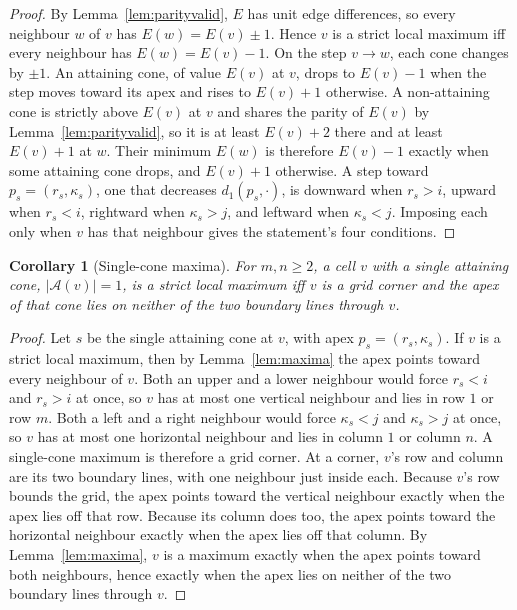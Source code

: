 \documentclass[11pt]{article}
\newtheorem{corollary}[theorem]{Corollary}
\theoremstyle{definition}
\theoremstyle{remark}
\newcommand{\dgrid}{d_1}
\newcommand{\Aset}{\mathcal{A}}
\begin{document}
\begin{proof}
By Lemma~\ref{lem:parityvalid}, $E$ has unit edge differences, so every
neighbour $w$ of $v$ has $E(w)=E(v)\pm1$. Hence $v$ is a strict local maximum iff
every neighbour has $E(w)=E(v)-1$. On the step $v\to w$, each cone changes by
$\pm1$. An attaining cone, of value $E(v)$ at $v$, drops to $E(v)-1$ when the
step moves toward its apex and rises to $E(v)+1$ otherwise. A non-attaining cone
is strictly above $E(v)$ at $v$ and shares the parity of $E(v)$ by
Lemma~\ref{lem:parityvalid}, so it is at least $E(v)+2$ there and at least
$E(v)+1$ at $w$. Their minimum $E(w)$ is therefore $E(v)-1$ exactly when some
attaining cone drops, and $E(v)+1$ otherwise. A step toward $p_s=(r_s,\kappa_s)$,
one that decreases $\dgrid(p_s,\cdot)$, is downward when $r_s>i$, upward when
$r_s<i$, rightward when $\kappa_s>j$, and leftward when $\kappa_s<j$. Imposing
each only when $v$ has that neighbour gives the statement's four conditions.
\end{proof}

\begin{corollary}[Single-cone maxima]\label{cor:corners}
For $m,n\ge2$, a cell $v$ with a single attaining cone, $|\Aset(v)|=1$, is a
strict local maximum iff $v$ is a grid corner and the apex of that cone lies on
neither of the two boundary lines through $v$.
\end{corollary}

\begin{proof}
Let $s$ be the single attaining cone at $v$, with apex $p_s=(r_s,\kappa_s)$. If
$v$ is a strict local maximum, then by Lemma~\ref{lem:maxima} the apex points
toward every neighbour of $v$. Both an upper and a lower neighbour would force
$r_s<i$ and $r_s>i$ at once, so $v$ has at most one vertical neighbour and lies
in row $1$ or row $m$. Both a left and a right neighbour would force
$\kappa_s<j$ and $\kappa_s>j$ at once, so $v$ has at most one horizontal
neighbour and lies in column $1$ or column $n$. A single-cone maximum is
therefore a grid corner. At a corner, $v$'s row and column are its two boundary
lines, with one neighbour just inside each. Because $v$'s row bounds the grid, the
apex points toward the vertical neighbour exactly when the apex lies off that row.
Because its column does too, the apex points toward the horizontal neighbour
exactly when the apex lies off that column. By
Lemma~\ref{lem:maxima}, $v$ is a maximum exactly when the apex points toward
both neighbours, hence exactly when the apex lies on neither of the two
boundary lines through $v$.
\end{proof}
\end{document}

